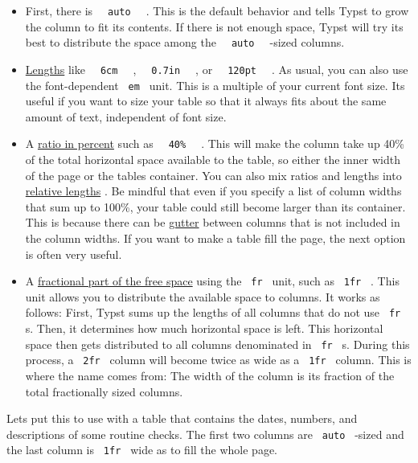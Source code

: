 \begin{itemize}
\tightlist
\item
  First, there is \texttt{\ }{\texttt{\ auto\ }}\texttt{\ } . This is
  the default behavior and tells Typst to grow the column to fit its
  contents. If there is not enough space, Typst will try its best to
  distribute the space among the
  \texttt{\ }{\texttt{\ auto\ }}\texttt{\ } -sized columns.
\item
  \href{/docs/reference/layout/length/}{Lengths} like
  \texttt{\ }{\texttt{\ 6cm\ }}\texttt{\ } ,
  \texttt{\ }{\texttt{\ 0.7in\ }}\texttt{\ } , or
  \texttt{\ }{\texttt{\ 120pt\ }}\texttt{\ } . As usual, you can also
  use the font-dependent \texttt{\ em\ } unit. This is a multiple of
  your current font size. It\textquotesingle s useful if you want to
  size your table so that it always fits about the same amount of text,
  independent of font size.
\item
  A \href{/docs/reference/layout/ratio/}{ratio in percent} such as
  \texttt{\ }{\texttt{\ 40\%\ }}\texttt{\ } . This will make the column
  take up 40\% of the total horizontal space available to the table, so
  either the inner width of the page or the table\textquotesingle s
  container. You can also mix ratios and lengths into
  \href{/docs/reference/layout/relative/}{relative lengths} . Be mindful
  that even if you specify a list of column widths that sum up to 100\%,
  your table could still become larger than its container. This is
  because there can be
  \href{/docs/reference/model/table/\#parameters-gutter}{gutter} between
  columns that is not included in the column widths. If you want to make
  a table fill the page, the next option is often very useful.
\item
  A \href{/docs/reference/layout/fraction/}{fractional part of the free
  space} using the \texttt{\ fr\ } unit, such as \texttt{\ 1fr\ } . This
  unit allows you to distribute the available space to columns. It works
  as follows: First, Typst sums up the lengths of all columns that do
  not use \texttt{\ fr\ } s. Then, it determines how much horizontal
  space is left. This horizontal space then gets distributed to all
  columns denominated in \texttt{\ fr\ } s. During this process, a
  \texttt{\ 2fr\ } column will become twice as wide as a
  \texttt{\ 1fr\ } column. This is where the name comes from: The width
  of the column is its fraction of the total fractionally sized columns.
\end{itemize}

Let\textquotesingle s put this to use with a table that contains the
dates, numbers, and descriptions of some routine checks. The first two
columns are \texttt{\ auto\ } -sized and the last column is
\texttt{\ 1fr\ } wide as to fill the whole page.

